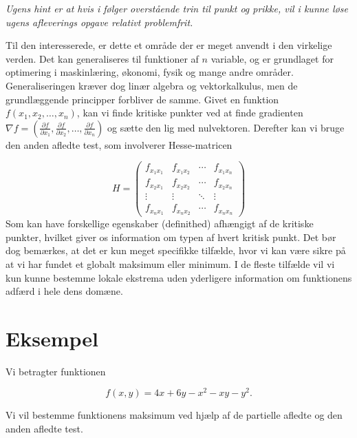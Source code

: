 \documentclass{article}
\begin{document}
\begin{titlepage}
\emph{Ugens hint er at hvis i følger overstående trin til punkt og prikke, vil i kunne løse ugens afleverings opgave relativt problemfrit.} \vspace{1em}

Til den interesserede, er dette et område der er meget anvendt i den virkelige verden. Det kan generaliseres til funktioner af $n$ variable, og er grundlaget for optimering i maskinlæring, økonomi, fysik og mange andre områder. Generaliseringen kræver dog linær algebra og vektorkalkulus, men de grundlæggende principper forbliver de samme. Givet en funktion $f(x_1, x_2, \ldots, x_n)$, kan vi finde kritiske punkter ved at finde gradienten $\nabla f = \left( \frac{\partial f}{\partial x_1}, \frac{\partial f}{\partial x_2}, \ldots, \frac{\partial f}{\partial x_n} \right)$ og sætte den lig med nulvektoren. Derefter kan vi bruge den anden afledte test, som involverer Hesse-matricen

$$H = \begin{pmatrix}
    f_{x_1x_1} & f_{x_1x_2} & \cdots & f_{x_1x_n} \\
    f_{x_2x_1} & f_{x_2x_2} & \cdots & f_{x_2x_n} \\
    \vdots & \vdots & \ddots & \vdots \\
    f_{x_nx_1} & f_{x_nx_2} & \cdots & f_{x_nx_n}
\end{pmatrix}$$
Som kan have forskellige egenskaber (definithed) afhængigt af de kritiske punkter, hvilket giver os information om typen af hvert kritisk punkt. Det bør dog bemærkes, at det er kun meget specifikke tilfælde, hvor vi kan være sikre på at vi har fundet et globalt maksimum eller minimum. I de fleste tilfælde vil vi kun kunne bestemme lokale ekstrema uden yderligere information om funktionens adfærd i hele dens domæne.


\end{titlepage}

\section*{Eksempel}

    Vi betragter funktionen

\[
f(x,y)=4x+6y-x^2-xy-y^2.
\]

Vi vil bestemme funktionens maksimum ved hjælp af de partielle
afledte og den anden afledte test.
\end{document}
